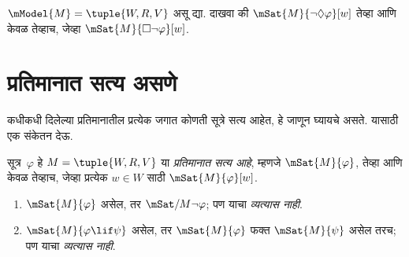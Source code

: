 \begin{prob}
  $\mModel{M} = \tuple{W, R, V}$ असू द्या. दाखवा की
  $\mSat{M}{\lnot\Diamond \varphi}[w]$ तेव्हा आणि केवळ तेव्हाच,
  जेव्हा $\mSat{M}{\Box\lnot\varphi}[w]$.
\end{prob}










\section{प्रतिमानात सत्य असणे}\label{nml:syn:tru:sec}

कधीकधी दिलेल्या प्रतिमानातील प्रत्येक जगात कोणती सूत्रे सत्य
आहेत, हे जाणून घ्यायचे असते. यासाठी एक संकेतन देऊ.

\begin{defn}
  सूत्र~$\varphi$ हे $M = \tuple{W, R,
    V}$ या \emph{प्रतिमानात सत्य आहे}, म्हणजे $\mSat{M}{\varphi}$,
  तेव्हा आणि केवळ तेव्हाच, जेव्हा प्रत्येक $w \in W$ साठी
  $\mSat{M}{\varphi}[w]$.
\end{defn}

\begin{prop}\label{nml:syn:tru:prop:truthfacts}
  \begin{enumerate}
  \item $\mSat{M}{\varphi}$ असेल, तर $\mSat/{M}{\lnot \varphi}$;
    पण याचा \emph{व्यत्यास नाही}.
  \item $\mSat{M}{\varphi \lif \psi}$ असेल, तर $\mSat{M}{\varphi}$
    फक्त $\mSat{M}{\psi}$ असेल तरच; पण याचा \emph{व्यत्यास नाही}.
  \end{enumerate}
\end{prop}

